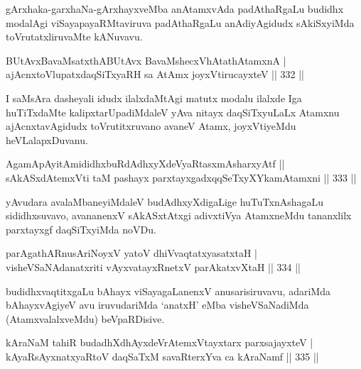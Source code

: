 \begin{artha}
gArxhaka-garxhaNa-gArxhayxveMba anAtamxvAda padAthaRgaLu budidhx modalAgi viSayapayaRMtaviruva padAthaRgaLu anAdiyAgidudx sAkiSxyiMda toVrutatxliruvaMte kANuvavu.
\end{artha}


\begin{shl}
BUtAvx\s BavaMsatxthA\s BUtAvx BavaMshecxVhAtathAtamxnA | \\
ajAcnxtoV\s lupatxdaqSiTxyaRH sa AtAmx joyxVtirucayxteV \hfill||  332 ||  
\end{shl}

\begin{artha}
I saMsAra dasheyali idudx ilalxdaMtAgi matutx modalu ilalxde Iga huTiTxdaMte kalipxtarUpadiMdaleV yAva nitayx daqSiTxyuLaLx Atamxnu ajAcnxtavAgidudx toVrutitxruvano avaneV Atamx, joyxVtiyeMdu heVLalapxDuvanu.
\end{artha}


\begin{shl}
AgamApAyitAmididhxbuRdAdhxyXdeVyaRtasxmAsharxyAtf ||  \\
sAkASxdAtemxVti taM pashayx parxtayxgadxqqSeTxyXYkamAtamxni \hfill||  333 ||  
\end{shl}

\begin{artha}
yAvudara avalaMbaneyiMdaleV budAdhxyXdigaLige huTuTxnAshagaLu sididhxsuvavo, avananenxV sAkASxtAtxgi adivxtiVya AtamxneMdu tananxlilx parxtayxgf daqSiTxyiMda noVDu.
\end{artha}

\begin{shl}
parAgathARnusAriNoyxV yatoV dhiVvaqtatxyasatxtaH | \\
visheVSaNAdanatxriti vAyxvatayxRnetxV parAkatxvXtaH \hfill||  334 ||  
\end{shl}

\begin{artha}
budidhxvaqtitxgaLu bAhayx viSayagaLanenxV anusarisiruvavu, adariMda bAhayxvAgiyeV avu iruvudariMda `anatxH' eMba visheVSaNadiMda (AtamxvalalxveMdu) beVpaRDisive.
\end{artha}


\begin{shl}
kAraNaM tahiR budadhXdhAyxdeVrAtemxVtayxtarx parxsajayxteV | \\
kAyaRsAyxnatxyaRtoV daqSaTxM savaRterxYva ca kAraNamf \hfill||  335 ||  
\end{shl}
				

